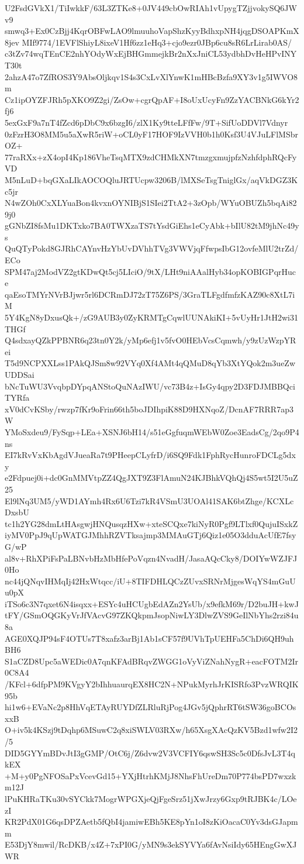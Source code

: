 U2FsdGVkX1/TiIwkkF/63L3ZTKe8+0JV449cbOwRIAh1vUpygTZjjvokySQ6JWv9
smwq3+Ex0CzBjj4KqrOBFwLAO9lmuuhoVapShzKyyBdhxpNH4jqgDSOAPKmX8jev
MIf9774/1EVFlShiyL8ixeV1Hf6zz1eHq3+cjo9ezr0JBp6cu8sR6LrLirab0AS/
c3tZv74wqTEnCE2nhYOdyWxEjBHGmmejkBr2nXxJniCL53ydbhDvHeHPvINYT30t
2ahzA47o7ZfROS3Y9AbsOljkqv1S4s3CxLvXlYnwK1mHBcBzfa9XY3v1g5IWVO8m
Cz1ipOYZFJRh5pXKO9Z2gi/ZsOw+cgrQpAF+I8oUxUcyFn9ZzYACBNkG6kYr2fj6
5exGxF9a7nT4fZcd6pDbC9x6bzgI6/zlX1Ky9tteLFfFw/9T+SifUoDDVl7Vdnyr
0zFzrH3O8MM5u5aXwR5riW+oCL0yF17HOF9IzVVH0b1h0Ksf3U4VJuLFlMSbrOZ+
77raRXx+zX4opI4Kp186VheTsqMTX9zdCHMkXN7tmzgxmujpfzNzhfdphRQcFyVD
M5nLuD+bqGXaLIkAOCOQluJRTUcpw3206B/lMXSeTsgTniglGx/aqVkDGZ3Kc5jr
N4wZOh0CxXLYuaBon4kvxnOYNIBjS1SIei2TtA2+3zOpb/WYuOBUZh5bqAi829j0
gGNbZI8fsMu1DKTxko7BA0TWXzaTS7tYsdGiEhs1eCyAbk+bIlU82tM9jhNc49ys
QuQTyPokd8GJRhCAYnvHzYbUvDVhhTVg3VWVjqFfwpsIbG12ovfeMlU2trZd/ECo
SPM47aj2ModVZ2gtKDwQt5cj5LIciO/9tX/LHt9niAAalHyb34opKOBIGPqrHuce
qaEsoTMYrNVrBJjwr5rl6DCRmDJ72zT75Z6PS/3GraTLFgdfmfzKAZ90c8XtL7iM
5Y4KgN8yDxusQk+/zG9AUB3y0ZyKRMTgCqwlUUNAkiKI+5vUyHr1JtH2wi31THGf
Q4sdxayQZkPPBNR6q23tn0Y2k/yMp6efj1v5fvO0HEbVcsCqmwh/y9zUzWzpYRei
T5d9NCPXXLss1PAkQJSm8w92VYq0Xf4AMt4qQMuD8qYb3XtYQok2m3ueZwUDDSai
bNcTuWU3VvqbpDYpqANStoQuNAzIWU/vc73B4z+IsGy4qpy2D3FDJMBBQciTYRfa
xV0dCvKSby/rwzp7fKr9oFrin66th5boJDIhpiK88D9HXNqoZ/DcnAF7RRR7ap3W
YMoSxdeu9/FySqp+LEa+XSNJ6bH14/s51eGgfuqmWEbW0Zoe3EadsCg/2qo9P4ns
EI7kRvVxKbAgdVJueaRa7t9PHeepCLyfrD/i6SQ9Fdk1FphRycHunroFDCLg5dxy
e2Fdpuej0i+dc0GnMMVtpZZ4QgJXT9Z3FlAmuN24KJBhkVQhQj4S5wt5I2U5uZ25
El9lNq3UM5/yWD1AYmh4Rx6U6Tzi7kR4VSmU3UOAl41SAK6btZhge/KCXLcDxsbU
tc1h2YG28dmLtHAsgwjHNQusqzHXw+xteSCQxe7kiNyR0Pgf9LTlxf0QujuISxkZ
iyMV0PpJ9qUpWATGJMhhRZVTksajmp3MMAuGTj6Qiz1e05O3dduAcUfE7fsyG/wP
al8v+RhXPiFsPaLBNvbHzMbHfePoVqzn4NvadH/JasaAQcCky8/DOIYwWZJFJ0Ho
nc44jQNqvIHMqIj42HxWtqcc/iU+8TIFDHLQCzZUvxSRNrMjgesWqYS4mGuUu0pX
iTSo6c3N7qxet6N4isqxx+ESYc4uHCUgbEdAZn2YsUb/x9efkM69r/D2buJH+kwJ
tFY/GSmOQGKyVrJfVAcvG97ZKQkpmJsopNiwLY3DlwZVS9GeIlNbYhs2rzi84u8a
AGE0XQJP94sF4OTUs7T8xafz3arBj1Ab1sCF57f9UVhTpUEHFa5ChDi6QH9uhBH6
S1aCZD8Upc5aWEDic0A7qnKFAdBRqvZWGG1oVyViZNahNygR+eacFOTM2Ir0C8A4
/KFcl+6dfpPM9KVgyY2bIhhuaurqEX8HC2N+NPukMyrhJrKISRfo3PvzWRQIK95b
hi1w6+EVaNc2p8HhVqETAyRUYDfZLRluRjPog4JGv5jQphrRT6tSW36goBCOsxxB
O+iv5k4KSzj9tDqhp6MSuwC2q8xiSWLV03RXw/h65XsgXAcQzKV5Bzd1wfw2I2/5
DID5GYYmBDvJtI3gGMP/OtC6j/Z6dvw2V3VCFIY6qswSH3Sc5c0DfsJvL3T4qkEX
+M+y0PgNFOSaPxVcevGd15+YXjHtrhKMjJ8NhsFhUreDm70P774bsPD7wxzkm12J
lPuKHRaTKu30vSYCkk7MogrWPGXjeQjFgeSrz51jXwJrzy6Gxp9tRJBK4c/LOezI
KR2PdX01G6qsDPZAetb5fQbI4jamiwEBh5KE8pYn1oI8zKiOacaC0Yv3dsGJapmm
E53DjY8mwil/RcDKB/x4Z+7xPI0G/yMN9s3ekSYVYa6fAvNsiIdy65HEngGwXJWR
